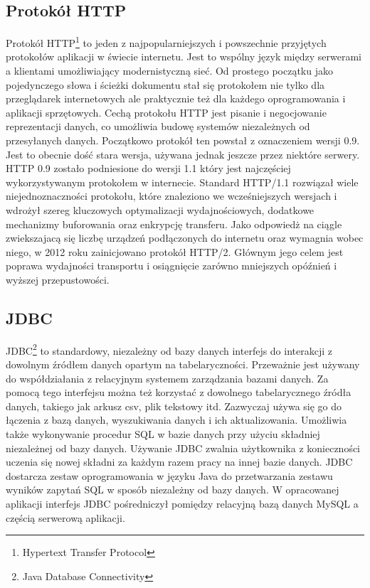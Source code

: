 \documentclass[12pt, twoside]{report}
\begin{document}
\subsection{Protokół HTTP}
Protokół HTTP\footnote{Hypertext Transfer Protocol} to jeden z najpopularniejszych i powszechnie przyjętych protokołów aplikacji w świecie internetu. Jest to wspólny język między serwerami a klientami umożliwiający modernistyczną sieć. Od prostego początku jako pojedynczego słowa i ścieżki dokumentu stał się protokołem nie tylko dla przeglądarek internetowych ale praktycznie też dla każdego oprogramowania i aplikacji sprzętowych\cite{http}. Cechą protokołu HTTP jest pisanie i negocjowanie reprezentacji danych, co umożliwia budowę systemów niezależnych od przesyłanych danych.
 Początkowo protokół ten powstał z oznaczeniem wersji 0.9. Jest to obecnie dość stara wersja, używana jednak jeszcze przez niektóre serwery. HTTP 0.9 zostało podniesione do wersji 1.1 który jest najczęściej wykorzystywanym protokołem w internecie. Standard HTTP/1.1 rozwiązał wiele niejednoznaczności protokołu, które znaleziono we wcześniejszych wersjach i wdrożył szereg kluczowych optymalizacji wydajnościowych, dodatkowe mechanizmy buforowania oraz enkrypcję transferu. Jako odpowiedż na ciągle zwiekszajacą się liczbę urządzeń podłączonych do internetu oraz wymagnia wobec niego, w 2012 roku zainicjowano protokół HTTP/2. Głównym jego celem jest poprawa wydajności transportu i osiągnięcie zarówno mniejszych opóźnień i wyższej przepustowości.
\subsection{JDBC}
JDBC\footnote{Java Database Connectivity} to standardowy, niezależny od bazy danych interfejs do interakcji z dowolnym źródłem danych opartym na tabelaryczności. Przeważnie jest używany do współdziałania z relacyjnym systemem zarządzania bazami danych. Za pomocą tego interfejsu można też korzystać z dowolnego tabelarycznego źródła danych, takiego jak arkusz csv, plik tekstowy itd. Zazwyczaj używa się go do łączenia z bazą danych, wyszukiwania danych i ich aktualizowania. Umożliwia także wykonywanie procedur SQL w bazie danych przy użyciu składniej niezależnej od bazy danych.\cite{jdbc} Używanie JDBC zwalnia użytkownika z konieczności uczenia się nowej składni za każdym razem pracy na innej bazie danych. JDBC dostarcza zestaw oprogramowania w języku Java do przetwarzania zestawu wyników zapytań SQL w sposób niezależny od bazy danych. W opracowanej aplikacji interfejs JDBC pośredniczył pomiędzy relacyjną bazą danych MySQL a częścią serwerową aplikacji.
\end{document}
